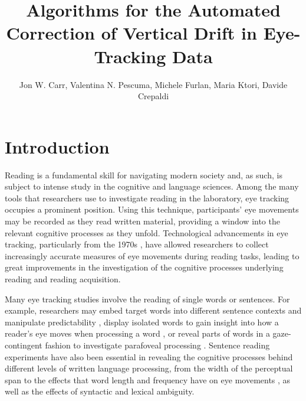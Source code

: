 \documentclass[doc,biblatex]{apa7}
\title{Algorithms for the Automated Correction of Vertical Drift in Eye-Tracking Data}
\author{Jon W. Carr, Valentina N. Pescuma, Michele Furlan, Maria Ktori, Davide Crepaldi}
\affiliation{Cognitive Neuroscience, International School for Advanced Studies, Trieste, Italy}
\begin{document}
\maketitle

\section{Introduction}

Reading is a fundamental skill for navigating modern society and, as such, is subject to intense study in the cognitive and language sciences. Among the many tools that researchers use to investigate reading in the laboratory, eye tracking occupies a prominent position. Using this technique, participants' eye movements may be recorded as they read written material, providing a window into the relevant cognitive processes as they unfold. Technological advancements in eye tracking, particularly from the 1970s \parencite[see e.g.,][]{Rayner:1998}, have allowed researchers to collect increasingly accurate measures of eye movements during reading tasks, leading to great improvements in the investigation of the cognitive processes underlying reading and reading acquisition.

Many eye tracking studies involve the reading of single words or sentences. For example, researchers may embed target words into different sentence contexts and manipulate predictability \parencite[e.g.,][]{Rayner:2001}, display isolated words to gain insight into how a reader's eye moves when processing a word \parencite[e.g.,][]{Vitu:2004}, or reveal parts of words in a gaze-contingent fashion to investigate parafoveal processing \parencite[e.g.,][]{Schotter:2012}. Sentence reading experiments have also been essential in revealing the cognitive processes behind different levels of written language processing, from the width of the perceptual span \parencite[e.g.,][]{Rayner:1986,Blythe:2009} to the effects that word length and frequency have on eye movements \parencite[e.g.,][]{Joseph:2009,TiffinRichards:2015}, as well as the effects of syntactic \parencite[e.g.,][]{Frazier:1982,Pickering:1998} and lexical \parencite[e.g.,][]{Sereno:2006} ambiguity.
\end{document}
